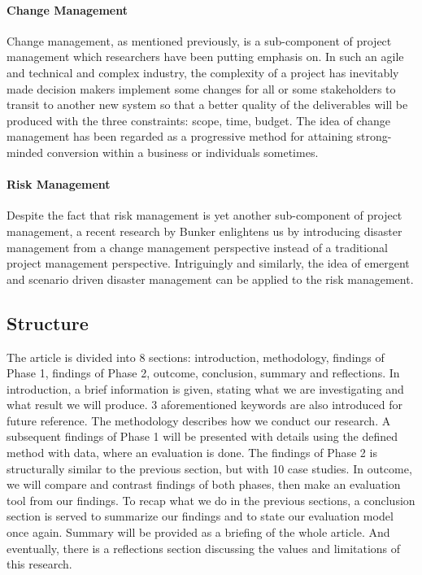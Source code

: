 \paragraph{Change Management}
Change management, as mentioned previously, is a sub-component of project management which researchers\parencite{3,6} have been putting emphasis on. In such an agile and technical and complex industry, the complexity of a project has inevitably made decision makers implement some changes for all or some stakeholders to transit to another new system\parencite[p. 1]{3} so that a better quality of the deliverables will be produced with the three constraints: scope, time, budget. The idea of change management has been regarded as a progressive method for attaining strong-minded conversion within a business or individuals sometimes\parencite[p. 3]{3}.

\paragraph{Risk Management}
Despite the fact that risk management is yet another sub-component of project management, a recent research by Bunker enlightens us by introducing disaster management from a change management perspective instead of a traditional project management perspective\parencite[p. 10]{6}. Intriguingly and similarly, the idea of emergent and scenario driven disaster management can be applied to the risk management.

\subsection{Structure}
The article is divided into 8 sections: introduction, methodology, findings of Phase 1, findings of Phase 2, outcome, conclusion, summary and reflections. In introduction, a brief information is given, stating what we are investigating and what result we will produce. 3 aforementioned keywords are also introduced for future reference. The methodology describes how we conduct our research. A subsequent findings of Phase 1 will be presented with details using the defined method with data, where an evaluation is done. The findings of Phase 2 is structurally similar to the previous section, but with 10 case studies. In outcome, we will compare and contrast findings of both phases, then make an evaluation tool from our findings. To recap what we do in the previous sections, a conclusion section is served to summarize our findings and to state our evaluation model once again. Summary will be provided as a briefing of the whole article. And eventually, there is a reflections section discussing the values and limitations of this research.
